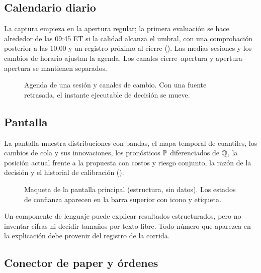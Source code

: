\subsection{Calendario diario}\label{sec:calendario}

La captura empieza en la apertura regular; la primera evaluación se hace alrededor de las 09:45 ET si la
calidad alcanza el umbral, con una comprobación posterior a las 10:00 y un registro próximo al cierre
(). Las medias sesiones y los cambios de horario ajustan la agenda. Los canales
cierre--apertura y apertura--apertura se mantienen separados.

\begin{figure}[H]
\centering
\resizebox{\linewidth}{!}{}
\caption{Agenda de una sesión y canales de cambio. Con una fuente retrasada, el instante ejecutable de
decisión se mueve.}
\label{fig:calendario}
\end{figure}

\subsection{Pantalla}\label{sec:pantalla}

La pantalla muestra distribuciones con bandas, el mapa temporal de cuantiles, los cambios de cola y sus
innovaciones, los pronósticos $\P$ diferenciados de $\Q$, la posición actual frente a la propuesta con costos
y riesgo conjunto, la razón de la decisión y el historial de calibración ().

\begin{figure}[H]
\centering
\resizebox{0.95\linewidth}{!}{}
\caption{Maqueta de la pantalla principal (estructura, sin datos). Los estados de confianza aparecen en la
barra superior con icono y etiqueta.}
\label{fig:pantalla}
\end{figure}

\begin{noconcluir}
Un componente de lenguaje puede explicar resultados estructurados, pero no inventar cifras ni decidir
tamaños por texto libre. Todo número que aparezca en la explicación debe provenir del registro de la
corrida.
\end{noconcluir}

\subsection{Conector de paper y órdenes}\label{sec:ordenes}

